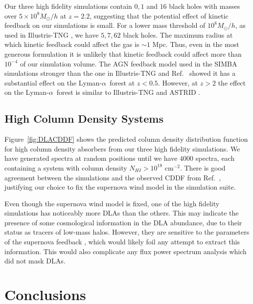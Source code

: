 \documentclass[a4paper,11pt]{article}
\newcommand{\Lya}{Lyman-$\alpha$}
\begin{document}
Our three high fidelity simulations contain $0, 1$ and $16$ black holes with masses over $5\times 10^8 M_\odot/h$ at $z=2.2$, suggesting that the potential effect of kinetic feedback on our simulations is small. For a lower mass threshold of $10^8 M_\odot/h$, as used in Illustris-TNG \cite{Weinberger:2017}, we have $5, 7, 62$ black holes. The maximum radius at which kinetic feedback could affect the gas is $\sim 1$ Mpc. Thus, even in the most generous formulation it is unlikely that kinetic feedback could affect more than $10^{-4}$ of our simulation volume. The AGN feedback model used in the SIMBA simulations \cite{SIMBA} stronger than the one in Illustris-TNG and Ref.~\cite{Tillman:2022} showed it has a substantial effect on the \Lya~forest at $z < 0.5$. However, at $z > 2$ the effect on the \Lya~forest is similar to Illustris-TNG and ASTRID \cite{Tillman:2023}.


\subsection{High Column Density Systems}
\label{sec:dlas}

Figure~\ref{fig:DLACDDF} shows the predicted column density distribution function for high column density absorbers from our three high fidelity simulations. We have generated spectra at random positions until we have $4000$ spectra, each containing a system with column density $N_{HI} > 10^{18}$ cm$^{-2}$. There is good agreement between the simulations and the observed CDDF from Ref.~\cite{2021MNRAS.507..704H}, justifying our choice to fix the supernova wind model in the simulation suite.

Even though the supernova wind model is fixed, one of the high fidelity simulations has noticeably more DLAs than the others. This may indicate the presence of some cosmological information in the DLA abundance, due to their status as tracers of low-mass halos. However, they are sensitive to the parameters of the supernova feedback \cite{Bird:2014}, which would likely foil any attempt to extract this information. This would also complicate any flux power spectrum analysis which did not mask DLAs.

\section{Conclusions}
\label{sec:conclusions}
\end{document}
